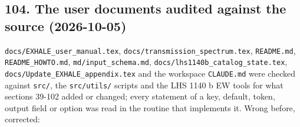 \documentclass[english,a4paper]{my_memo}
\begin{document}
\subsection{104. The user documents audited against the source (2026-10-05)}\label{104-the-user-documents-audited-against-the-source-2026-10-05}

\texttt{docs/EXHALE\_user\_manual.tex}, \texttt{docs/transmission\_spectrum.tex}, \texttt{README.md},
\texttt{README\_HOWTO.md}, \texttt{md/input\_schema.md}, \texttt{docs/lhs1140b\_catalog\_state.tex},
\texttt{docs/Update\_EXHALE\_appendix.tex} and the workspace \texttt{CLAUDE.md} were checked
against \texttt{src/}, the \texttt{src/utils/} scripts and the LHS 1140 b EW tools for what
sections 39-102 added or changed; every statement of a key, default, token,
output field or option was read in the routine that implements it. Wrong
before, corrected:
\end{document}
